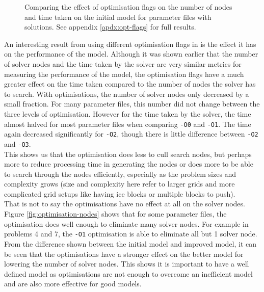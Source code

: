 \documentclass{article}
\newcommand{\n}[0]{\\[\baselineskip]}
\begin{document}
\begin{figure}[H]
\begin{minipage}{0.45\textwidth}
\end{minipage}
\caption{Comparing the effect of optimisation flags on the number of nodes and time taken on the initial model for parameter files with solutions. See appendix \ref{apdx:opt-flags} for full results.}
\end{figure}
\noindent
An interesting result from using different optimisation flags in is the effect it has on the performance of the model. Although it was shown earlier that the number of solver nodes and the time taken by the solver are very similar metrics for measuring the performance of the model, the optimisation flags have a much greater effect on the time taken compared to the number of nodes the solver has to search. With optimisations, the number of solver nodes only decreased by a small fraction. For many parameter files, this number did not change between the three levels of optimisation. However for the time taken by the solver, the time almost halved for most parameter files when comparing \texttt{-O0} and \texttt{-O1}. The time again decreased significantly for \texttt{-O2}, though there is little difference between \texttt{-O2} and \texttt{-O3}.
\n
This shows us that the optimisation does less to cull search nodes, but perhaps more to reduce processing time in generating the nodes or does more to be able to search through the nodes efficiently, especially as the problem sizes and complexity grows (size and complexity here refer to larger grids and more complicated grid setups like having ice blocks or multiple blocks to push). 
\n
That is not to say the optimisations have no effect at all on the solver nodes. Figure \ref{fig:optimisation-nodes} shows that for some parameter files, the optimisation does well enough to eliminate many solver nodes. For example in problems 4 and 7, the \texttt{-O1} optimisation is able to eliminate all but 1 solver node. From the difference shown between the initial model and improved model, it can be seen that the optimisations have a stronger effect on the better model for lowering the number of solver nodes. This shows it is important to have a well defined model as optimisations are not enough to overcome an inefficient model and are also more effective for good models. 
\end{document}
